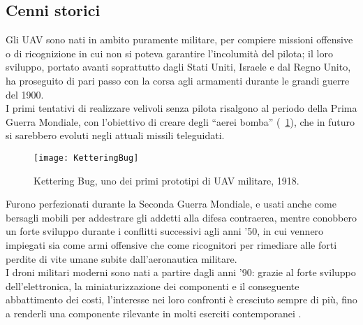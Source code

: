 \subsection[Cenni storici]{Cenni storici}
Gli UAV sono nati in ambito puramente militare, per compiere missioni offensive o di ricognizione in cui non si poteva garantire l'incolumità del pilota; il loro sviluppo, portato avanti soprattutto dagli Stati Uniti, Israele e dal Regno Unito, ha proseguito di pari passo con la corsa agli armamenti durante le grandi guerre del 1900. \\
I primi tentativi di realizzare velivoli senza pilota risalgono al periodo della Prima Guerra Mondiale, con l'obiettivo di creare degli “aerei bomba” (\figurename\ \ref{fig:Kettering_Bug}), che in futuro si sarebbero evoluti negli attuali missili teleguidati. 
%
\begin{figure}{}
	\begin{center}
		\texttt{[image: KetteringBug]}
	\end{center}
	\caption{Kettering Bug, uno dei primi prototipi di UAV militare, 1918.} \label{fig:Kettering_Bug}
\end{figure}
%
Furono perfezionati durante la Seconda Guerra Mondiale, e usati anche come bersagli mobili per addestrare gli addetti alla difesa contraerea, mentre conobbero un forte sviluppo durante i conflitti successivi agli anni '50, in cui vennero impiegati sia come armi offensive che come ricognitori per rimediare alle forti perdite di vite umane subite dall'aeronautica militare.  \\
I droni militari moderni sono nati a partire dagli anni '90: grazie al forte sviluppo dell'elettronica, la miniaturizzazione dei componenti e il conseguente abbattimento dei costi, l'interesse nei loro confronti è cresciuto sempre di più, fino a renderli una componente rilevante in molti eserciti contemporanei \cite{keane2013brief}.

